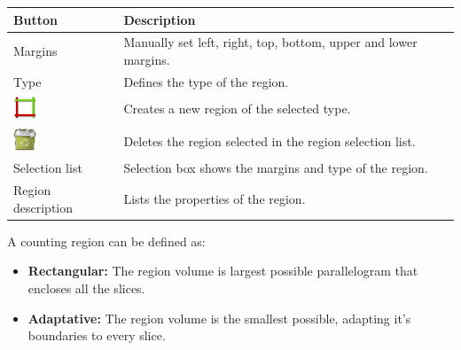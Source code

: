\begin{tabular}{| m{1.3cm} | m{12cm} |}
\hline
\textbf{Button} & \textbf{Description}\\
\hline
Margins & Manually set left, right, top, bottom, upper and lower margins.\\
\hline
Type & Defines the type of the region.\\
\hline
\includegraphics[width=0.7cm]{../../plugins/CountingRegion/rsc/apply} & Creates a new region of the selected type.\\
\hline
\includegraphics[width=0.7cm]{../../plugins/CountingRegion/rsc/trash-full} & Deletes the region selected in the region selection list.\\
\hline
Selection list & Selection box shows the margins and type of the region.\\
\hline
Region description & Lists the properties of the region.\\
\hline
\end{tabular}
\vspace{0.3cm} 

A counting region can be defined as:
\begin{itemize}
\item \textbf{Rectangular:} The region volume is largest possible parallelogram that encloses all the slices.
\item \textbf{Adaptative:} The region volume is the smallest possible, adapting it's boundaries to every slice.
\end{itemize}
